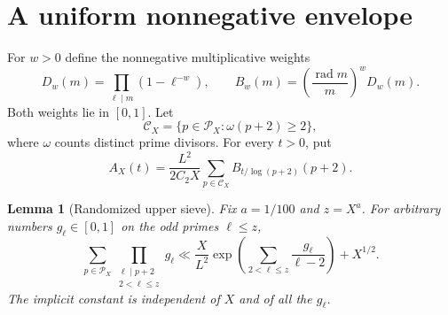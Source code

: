 \documentclass[11pt]{article}
\newtheorem{lemma}[theorem]{Lemma}
\theoremstyle{remark}
\newcommand{\rad}{\operatorname{rad}}
\begin{document}
\section{A uniform nonnegative envelope}
For $w>0$ define the nonnegative multiplicative weights
\begin{equation}\label{eq:DH}
 D_w(m)=\prod_{\ell\mid m}(1-\ell^{-w}),\qquad
 B_w(m)=\left(\frac{\rad m}{m}\right)^wD_w(m).
\end{equation}
Both weights lie in $[0,1]$. Let
\[
 \mathcal C_X=\{p\in\mathcal P_X:\omega(p+2)\ge2\},
\]
where $\omega$ counts distinct prime divisors. For every $t>0$, put
\begin{equation}\label{eq:AX}
 A_X(t)=\frac{L^2}{2C_2X}\sum_{p\in\mathcal C_X}
                  B_{t/\log(p+2)}(p+2).
\end{equation}

\begin{lemma}[Randomized upper sieve]\label{lem:sieve}
Fix $a=1/100$ and $z=X^a$. For arbitrary numbers
$g_\ell\in[0,1]$ on the odd primes $\ell\le z$,
\begin{equation}\label{eq:random-upper}
 \sum_{p\in\mathcal P_X}\prod_{\substack{\ell\mid p+2\\2<\ell\le z}}g_\ell
 \ll \frac{X}{L^2}
       \exp\left(\sum_{2<\ell\le z}\frac{g_\ell}{\ell-2}\right)
       +X^{1/2}.
\end{equation}
The implicit constant is independent of $X$ and of all the $g_\ell$.
\end{lemma}
\end{document}
